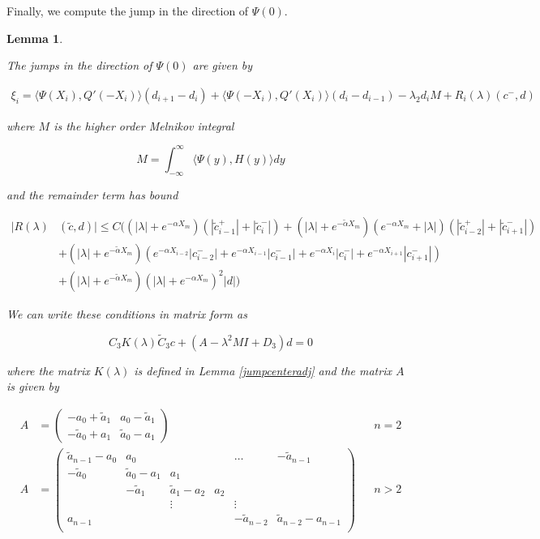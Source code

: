 \documentclass[12pt]{article}
\newtheorem{lemma}{Lemma}
\begin{document}
Finally, we compute the jump in the direction of $\Psi(0)$.

\begin{lemma}\label{jumpadj}

The jumps in the direction of $\Psi(0)$ are given by

\begin{align}\label{xi}
\xi_i = \langle \Psi(X_i), Q'(-X_i) \rangle (d_{i+1} - d_i)
+ \langle \Psi(-X_i), Q'(X_i) \rangle (d_i - d_{i-1})
- \lambda_2 d_i M + R_i(\lambda)(c^-, d)
\end{align}

where $M$ is the higher order Melnikov integral

\begin{equation}\label{M}
M = \int_{-\infty}^\infty \langle \Psi(y), H(y) \rangle dy 
\end{equation}

and the remainder term has bound

\begin{align}\label{R}
|R(\lambda)&(\tilde{c}, d)| \leq C \Big(
(|\lambda| + e^{-\alpha X_m})(|\tilde{c}_{i-1}^+| + |\tilde{c}_{i}^-|) + (|\lambda| + e^{-\tilde{\alpha} X_m})(e^{-\alpha X_m} + |\lambda|) ( |\tilde{c}_{i-2}^+| + |\tilde{c}_{i+1}^-|) \\
&+ (|\lambda| + e^{-\tilde{\alpha} X_m})( e^{-\alpha X_{i-2}} |c_{i-2}^-| + e^{-\alpha X_{i-1}} |c_{i-1}^-| + e^{-\alpha X_i} |c_i^-| + e^{-\alpha X_{i+1}} |c_{i+1}^-|) \nonumber \\
&+ (|\lambda| + e^{-\tilde{\alpha} X_m})(|\lambda| + e^{-\alpha X_m})^2 |d| \nonumber \Big)
\end{align}

We can write these conditions in matrix form as

\begin{equation}
C_3 K(\lambda) \tilde{C}_3 c + (A -\lambda^2 M I + D_3)d = 0
\end{equation}

where the matrix $K(\lambda)$ is defined in Lemma \ref{jumpcenteradj} and the matrix $A$ is given by

\begin{align*}
A &= \begin{pmatrix}
-a_0 + \tilde{a}_1 & a_0 - \tilde{a}_1 \\
-\tilde{a}_0 + a_1 & \tilde{a}_0 - a_1
\end{pmatrix} && n = 2 \\
A &= \begin{pmatrix}
\tilde{a}_{n-1} - a_0 & a_0 & & & \dots & -\tilde{a}_{n-1}\\
-\tilde{a}_0 & \tilde{a}_0 - a_1 &  a_1 \\
& -\tilde{a}_1 & \tilde{a}_1 - a_2 &  a_2 \\
& & \vdots & & \vdots \\
a_{n-1} & & & & -\tilde{a}_{n-2} & \tilde{a}_{n-2} - a_{n-1} \\
\end{pmatrix} && n > 2
\end{align*}


\end{lemma}
\end{document}
